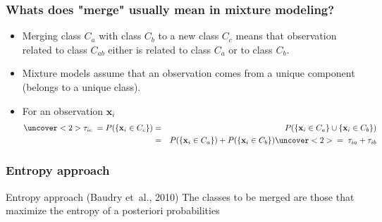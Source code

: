 \begin{frame}[t]
\frametitle{Whats does "merge" usually mean  in mixture modeling?}
\begin{itemize}
\item Merging class $C_a$ with class $C_b$ to a new class $C_c$ means that observation related to class $C_{ab}$ either is related to class $C_a$ or to class $C_b$.
\item Mixture models assume that an observation comes from a unique component (belongs to a unique class).
\item For an observation $\textbf{x}_i$ 
\begin{eqnarray*} 
\uncover<2>{ \tau_{i c}  \;=\;} P( \{ \textbf{x}_i \in C_{c} \})  &=& P( \{ \textbf{x}_i \in C_{a} \} \cup \{ \textbf{x}_i \in C_{b} \} ) \\
&=& P( \{ \textbf{x}_i \in C_{a} \}) + P( \{ \textbf{x}_i \in C_{b} \} )  \uncover<2>{ \;=\; \tau_{i a} + \tau_{i b} }
\end{eqnarray*} 
\end{itemize}
\end{frame}

\begin{frame}[t]
\frametitle{Entropy approach}
\begin{block}{Entropy approach (Baudry et~al., 2010)}
The classes to be merged are those that maximize the entropy of a posteriori probabilities
\end{block}
\small
{}
\end{frame}

